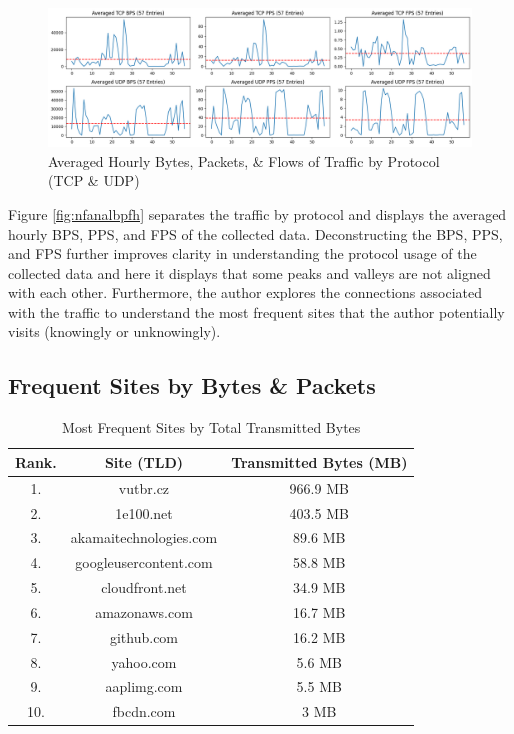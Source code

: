 \documentclass{article}
\begin{document}
\begin{figure}[htbp]
    \centering
    \includegraphics[width=1\linewidth]{img/bpf-h-s.png}
    \caption{Averaged Hourly Bytes, Packets, \& Flows of Traffic by Protocol (TCP \& UDP)}
    \label{fig:nfanalbpfhs}
\end{figure}

Figure \ref{fig:nfanalbpfh} separates the traffic by protocol and displays the averaged hourly BPS, PPS, and FPS of the collected data. Deconstructing the BPS, PPS, and FPS further improves clarity in understanding the protocol usage of the collected data and here it displays that some peaks and valleys are not aligned with each other. Furthermore, the author explores the connections associated with the traffic to understand the most frequent sites that the author potentially visits (knowingly or unknowingly).

\subsection{Frequent Sites by Bytes \& Packets}

\begin{table}[H]
    \centering
    \begin{tabular}{ccc}
         Rank. & Site (TLD) & Transmitted Bytes (MB)\\
         \hline
         1. & vutbr.cz & 966.9 MB \\
         2. & 1e100.net & 403.5 MB \\
         3. & akamaitechnologies.com & 89.6 MB \\
         4. & googleusercontent.com & 58.8 MB \\
         5. & cloudfront.net & 34.9 MB \\
         6. & amazonaws.com & 16.7 MB \\
         7. & github.com & 16.2 MB \\
         8. & yahoo.com & 5.6 MB \\
         9. & aaplimg.com & 5.5 MB \\
         10. & fbcdn.com & 3 MB \\
    \end{tabular}
    \caption{Most Frequent Sites by Total Transmitted Bytes}
    \label{tab:nfsite-bytes}
\end{table}
\end{document}
